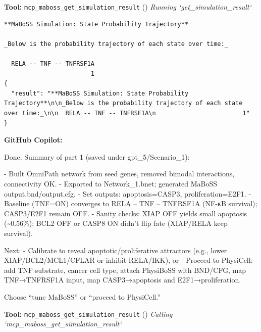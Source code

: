 \documentclass[11pt,a4paper]{article}
\begin{document}
\begin{toolokbox}
\textbf{Tool:} \texttt{mcp\_maboss\_get\_simulation\_result} (\checkmark)
\textit{Running `get\_simulation\_result`}
\begin{lstlisting}
**MaBoSS Simulation: State Probability Trajectory**

_Below is the probability trajectory of each state over time:_

  RELA -- TNF -- TNFRSF1A
                        1
{
  "result": "**MaBoSS Simulation: State Probability Trajectory**\n\n_Below is the probability trajectory of each state over time:_\n\n  RELA -- TNF -- TNFRSF1A\n                        1"
}
\end{lstlisting}
\end{toolokbox}
\begin{copilotbox}
\textbf{GitHub Copilot:}

Done. Summary of part 1 (saved under gpt\_5/Scenario\_1):

- Built OmniPath network from seed genes, removed bimodal interactions, connectivity OK.
- Exported to Network\_1.bnet; generated MaBoSS output.bnd/output.cfg.
- Set outputs: apoptosis=CASP3, proliferation=E2F1.
- Baseline (TNF=ON) converges to RELA -- TNF -- TNFRSF1A (NF-κB survival); CASP3/E2F1 remain OFF.
- Sanity checks: XIAP OFF yields small apoptosis (\textasciitilde{}0.56\%); BCL2 OFF or CASP8 ON didn’t flip fate (XIAP/RELA keep survival).

Next:
- Calibrate to reveal apoptotic/proliferative attractors (e.g., lower XIAP/BCL2/MCL1/CFLAR or inhibit RELA/IKK), or
- Proceed to PhysiCell: add TNF substrate, cancer cell type, attach PhysiBoSS with BND/CFG, map TNF→TNFRSF1A input, map CASP3→apoptosis and E2F1→proliferation.

Choose “tune MaBoSS” or “proceed to PhysiCell.”

\end{copilotbox}
\begin{toolokbox}
\textbf{Tool:} \texttt{mcp\_maboss\_get\_simulation\_result} (\checkmark)
\textit{Calling `mcp\_maboss\_get\_simulation\_result`}
\end{toolokbox}
\end{document}
